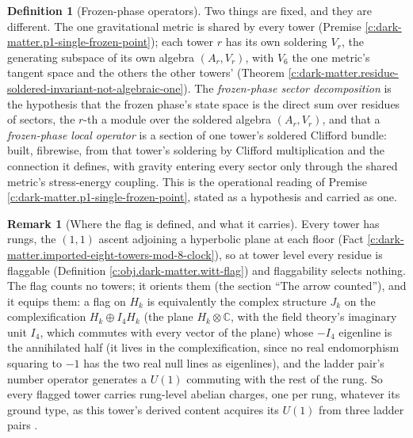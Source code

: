 \documentclass[11pt]{article}
\theoremstyle{definition}
\newtheorem{definition}[theorem]{Definition}
\newtheorem{remark}[theorem]{Remark}
\theoremstyle{plain}
\newcommand{\changedmark}[2]{\marginpar{\raggedright\scriptsize\color{#1}#2}}
\providecommand{\C}{}\renewcommand{\C}{\mathbb{C}}
\begin{document}
\begin{definition}[Frozen-phase operators]\label{c:obj.dark-matter.frozen-phase-operators}
Two things are fixed, and they are different. The one gravitational metric is shared by every tower (Premise \ref{c:dark-matter.p1-single-frozen-point}); each tower $r$ has its own soldering $V_{r}$, the generating subspace of its own algebra $(A_{r}, V_{r})$, with $V_{6}$ the one metric's tangent space and the others the other towers' (Theorem \ref{c:dark-matter.residue-soldered-invariant-not-algebraic-one}). The \emph{frozen-phase sector decomposition} is the hypothesis that the frozen phase's state space is the direct sum over residues of sectors, the $r$-th a module over the soldered algebra $(A_{r}, V_{r})$, and that a \emph{frozen-phase local operator} is a section of one tower's soldered Clifford bundle: built, fibrewise, from that tower's soldering by Clifford multiplication and the connection it defines, with gravity entering every sector only through the shared metric's stress-energy coupling. This is the operational reading of Premise \ref{c:dark-matter.p1-single-frozen-point}, stated as a hypothesis and carried as one.
\end{definition}

\begin{remark}[Where the flag is defined, and what it carries]\label{c:note.dark-matter.where-flag-defined-what-it-carries}
\changedmark{gray}{reworded}
Every tower has rungs, the $(1,1)$ ascent adjoining a hyperbolic plane at each floor (Fact \ref{c:dark-matter.imported-eight-towers-mod-8-clock}), so at tower level every residue is flaggable (Definition \ref{c:obj.dark-matter.witt-flag}) and flaggability selects nothing. The flag counts no towers; it orients them (the section ``The arrow counted''), and it equips them: a flag on $H_{k}$ is equivalently the complex structure $J_{k}$ on the complexification $H_{k} \oplus I_4H_{k}$ (the plane $H_{k} \otimes \C$, with the field theory's imaginary unit $I_4$, which commutes with every vector of the plane) whose $-I_4$ eigenline is the annihilated half (it lives in the complexification, since no real endomorphism squaring to $-1$ has the two real null lines as eigenlines), and the ladder pair's number operator generates a $U(1)$ commuting with the rest of the rung. So every flagged tower carries rung-level abelian charges, one per rung, whatever its ground type, as this tower's derived content acquires its $U(1)$ from three ladder pairs \cite{ButlerT12}.
\end{remark}
\end{document}
